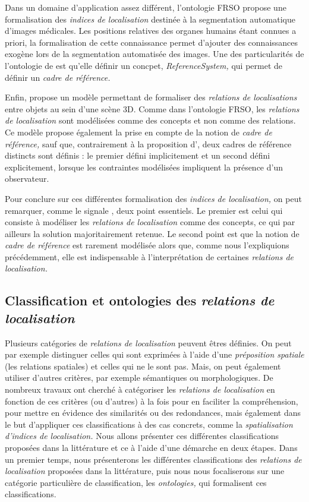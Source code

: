 Dans un domaine d’application assez différent, l'ontologie FRSO
\autocite{Hudelot2008a} propose une formalisation des \emph{indices de
  localisation} destinée à la segmentation automatique d'images
médicales. Les positions relatives des organes humains étant connues a
priori, la formalisation de cette connaissance permet d'ajouter des
connaissances exogène lors de la segmentation automatisée des
images. Une des particularités de l'ontologie de
\textcite{Hudelot2008a} est qu'elle définir un concpet,
\emph{ReferenceSystem,} qui permet de définir un \emph{cadre de
  référence.}

Enfin, \textcite{Trinh2012} propose un modèle permettant de formaliser
des \emph{relations de localisations} entre objets au sein d'une scène
3D. Comme dans l'ontologie FRSO, les \emph{relations de localisation}
sont modélisées comme des concepts et non comme des relations. Ce
modèle propose également la prise en compte de la notion de
\emph{cadre de référence,} sauf que, contrairement à la proposition
d'\textcite{Hudelot2008a}, deux cadres de référence distincts sont
définis : le premier défini implicitement et un second défini
explicitement, lorsque les contraintes modélisées impliquent la
présence d'un observateur.

Pour conclure sur ces différentes formalisation des \emph{indices de
  localisation,} on peut remarquer, comme le signale
\textcite{Duchene2019}, deux point essentiels. Le premier est celui
qui consiste à modéliser les \emph{relations de localisation} comme
des concepts, ce qui par ailleurs la solution majoritairement
retenue. Le second point est que la notion de \emph{cadre de
  référence} est rarement modélisée alors que, comme nous
l'expliquions précédemment, elle est indispensable à l'interprétation
de certaines \emph{relations de localisation.}

\subsection{Classification et ontologies des \emph{relations de
    localisation}}

Plusieurs catégories de \emph{relations de localisation} peuvent êtres
définies. On peut par exemple distinguer celles qui sont exprimées à
l'aide d'une \emph{préposition spatiale} (\ie les relations spatiales)
et celles qui ne le sont pas. Mais, on peut également utiliser
d'autres critères, par exemple sémantiques ou morphologiques. De
nombreux travaux ont cherché à catégoriser les \emph{relations de
  localisation} en fonction de ces critères (ou d'autres) à la fois
pour en faciliter la compréhension, pour mettre en évidence des
similarités ou des redondances, mais également dans le but d'appliquer
ces classifications à des cas concrets, comme la \emph{spatialisation
  d'indices de localisation.} Nous allons présenter ces différentes
classifications proposées dans la littérature et ce à l'aide d'une
démarche en deux étapes. Dans un premier temps, nous présenterons les
différentes classifications des \emph{relations de localisation}
proposées dans la littérature, puis nous nous focaliserons sur une
catégorie particulière de classification, les \emph{ontologies,} qui
formalisent ces classifications.

